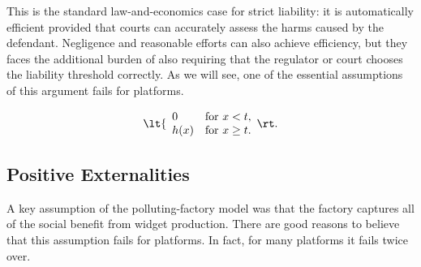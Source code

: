 This is the standard law-and-economics case for strict liability: it is automatically efficient provided that courts can accurately assess the harms caused by the defendant. Negligence and reasonable efforts can also achieve efficiency, but they faces the additional burden of also requiring that the regulator or court chooses the liability threshold correctly. As we will see, one of the essential assumptions of this argument fails for platforms.


\begin{equation}
\lt\{\begin{array}{ll}
	0 & \mbox{for $x <t$}, \\
	h(x) & \mbox{for $x \ge t$}.
\end{array}\rt.
\end{equation}


\subsection{Positive Externalities}

A key assumption of the polluting-factory model was that the factory captures all of the social benefit from widget production. There are good reasons to believe that this assumption fails for platforms. In fact, for many platforms it fails twice over.

